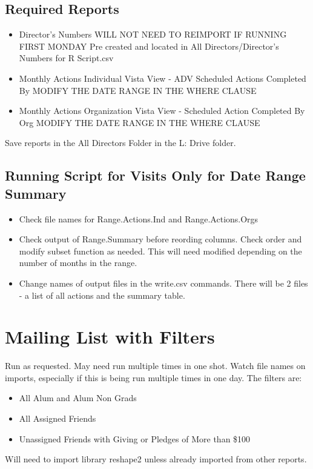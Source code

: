\documentclass{article}
\begin{document}
\subsection{Required Reports}
\begin{itemize}
	\item Director's Numbers
	\subitem WILL NOT NEED TO REIMPORT IF RUNNING FIRST MONDAY 
	\subitem Pre created and located in All Directors/Director's Numbers for R Script.csv 
	\item Monthly Actions Individual 
	\subitem Vista View - ADV Scheduled Actions Completed By
	\subitem MODIFY THE DATE RANGE IN THE WHERE CLAUSE
	\item Monthly Actions Organization
	\subitem Vista View - Scheduled Action Completed By Org
	\subitem MODIFY THE DATE RANGE IN THE WHERE CLAUSE
\end{itemize}
Save reports in the All Directors Folder in the L: Drive folder.
\subsection{Running Script for Visits Only for Date Range Summary}
\begin{itemize}
	\item Check file names for Range.Actions.Ind and Range.Actions.Orgs
	\item Check output of Range.Summary before reording columns.
	\subitem Check order and modify subset function as needed. 
	\subitem This will need modified depending on the number of months in the range.
	\item Change names of output files in the write.csv commands. 
	\subitem There will be 2 files - a list of all actions and the summary table.
\end{itemize}

\section{Mailing List with Filters}
Run as requested. May need run multiple times in one shot. Watch file names on imports, especially if this is being run multiple times in one day. The filters are:
\begin{itemize}
	\item All Alum and Alum Non Grads
	\item All Assigned Friends
	\item Unassigned Friends with Giving or Pledges of More than \$100
\end{itemize}
Will need to import library reshape2 unless already imported from other reports.
\end{document}
